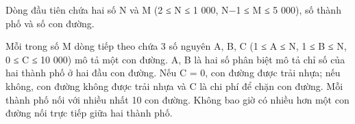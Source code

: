 Dòng đầu tiên chứa hai số N và M (2 ≤ N ≤ 1 000, N−1 ≤ M ≤ 5 000), số thành phố và số con đường.  

   Mỗi trong số M dòng tiếp theo chứa 3 số nguyên A, B, C (1 ≤ A ≤ N, 1 ≤ B ≤ N, 0 ≤ C ≤ 10 000) mô tả một con đường. A, B là hai số phân biệt mô tả chỉ số của hai thành phố ở hai đầu con đường. Nếu C = 0, con đường được trải nhựa; nếu không, con đường không được trải nhựa và C là chi phí để chặn con đường. Mỗi thành phố nối với nhiều nhất 10 con đường. Không bao giờ có nhiều hơn một con đường nối trực tiếp giữa hai thành phố.